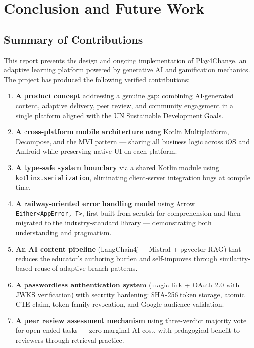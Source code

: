 %
%
\chapter{Conclusion and Future Work}
\label{cha:conclusion}

\section{Summary of Contributions}
\label{sec:summary}

This report presents the design and ongoing implementation of Play4Change, an adaptive learning platform powered by generative AI and gamification mechanics. The project has produced the following verified contributions:

\begin{enumerate}
    \item \textbf{A product concept} addressing a genuine gap: combining AI-generated content, adaptive delivery, peer review, and community engagement in a single platform aligned with the UN Sustainable Development Goals.
    \item \textbf{A cross-platform mobile architecture} using Kotlin Multiplatform, Decompose, and the MVI pattern — sharing all business logic across iOS and Android while preserving native UI on each platform.
    \item \textbf{A type-safe system boundary} via a shared Kotlin module using \texttt{kotlinx.serialization}, eliminating client-server integration bugs at compile time.
    \item \textbf{A railway-oriented error handling model} using Arrow \texttt{Either<AppError, T>}, first built from scratch for comprehension and then migrated to the industry-standard library — demonstrating both understanding and pragmatism.
    \item \textbf{An AI content pipeline} (LangChain4j + Mistral + pgvector RAG) that reduces the educator's authoring burden and self-improves through similarity-based reuse of adaptive branch patterns.
    \item \textbf{A passwordless authentication system} (magic link + OAuth 2.0 with JWKS verification) with security hardening: SHA-256 token storage, atomic CTE claim, token family revocation, and Google audience validation.
    \item \textbf{A peer review assessment mechanism} using three-verdict majority vote for open-ended tasks — zero marginal AI cost, with pedagogical benefit to reviewers through retrieval practice.

\end{enumerate}
